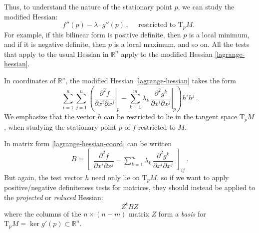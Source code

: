\documentclass[12pt]{article}
\newcommand{\real}{\mathbb{R}}
\begin{document}
Thus, to understand the nature of the stationary point $p$, we can study the modified Hessian:
\begin{equation}\label{lagrange-hessian}
f''(p) - \lambda \cdot g''(p)\,, \quad \text{ restricted to $\mathrm{T}_p M$. }
\end{equation}
For example, if this bilinear form is positive definite, then $p$ is a local minimum,
and if it is negative definite, then $p$ is a local maximum, and so on.
All the tests that apply to the usual Hessian in $\real^n$ apply to the modified Hessian \eqref{lagrange-hessian}.

In coordinates of $\real^n$, the modified Hessian \eqref{lagrange-hessian}
takes the form
\begin{equation}\label{lagrange-hessian-coord}
\sum_{i=1}^n \sum_{j=1}^n \left( \left.\frac{\partial^2 f}{\partial x^i \partial x^j}\right|_p - \sum_{k=1}^m \lambda_k \, \left.\frac{\partial^2 g^k}{\partial x^i \partial x^j}\right|_p \right)  h^i h^j\,.
\end{equation}
We emphasize that the vector $h$ can be restricted to lie in the tangent space $\mathrm{T}_p M$,
when studying the stationary point $p$ of $f$ restricted to $M$.

In matrix form \eqref{lagrange-hessian-coord}
can be written
\begin{equation}\label{lagrange-hessian-matrix}
B= \begin{bmatrix}
\dfrac{\partial^2 f}{\partial x^i \partial x^j} - \sum\limits_{k=1}^m \lambda_k \, \dfrac{\partial^2 g^k}{\partial x^i \partial x^j} 
\end{bmatrix}_{ij}\,.
\end{equation}
But again, the test vector $h$ need only lie on $\mathrm{T}_p M$,
so if we want to apply positive/negative definiteness tests for matrices,
they should instead be applied to the \emph{projected} or \emph{reduced} Hessian:
\begin{equation}
Z^\mathrm{t} B Z
\end{equation}
where the columns of the $n \times (n-m)$ matrix $Z$ form a \emph{basis}
for $\mathrm{T}_p M = \ker g'(p) \subset \real^n$.
\end{document}
